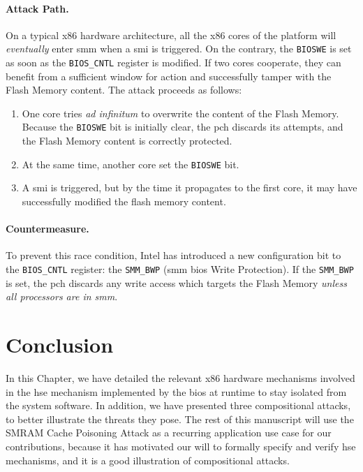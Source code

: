 \paragraph{Attack Path.}
%
On a typical x86 hardware architecture, all the x86 cores of the platform will
\emph{eventually} enter \ac{smm} when a \ac{smi} is triggered.
%
On the contrary, the \texttt{BIOSWE} is set as soon as the \texttt{BIOS\_CNTL}
register is modified.
%
If two cores cooperate, they can benefit from a sufficient window for action and
successfully tamper with the Flash Memory content.
%
The attack proceeds as follows:

\begin{enumerate}
\item One core tries \emph{ad infinitum} to overwrite the content of the Flash
  Memory.
  Because the \texttt{BIOSWE} bit is initially clear, the \ac{pch} discards its
  attempts, and the Flash Memory content is correctly protected.
%
\item At the same time, another core set the \texttt{BIOSWE} bit.
%
\item A \ac{smi} is triggered, but by the time it propagates to the first core,
  it may have successfully modified the flash memory content.
%
\end{enumerate}

\paragraph{Countermeasure.}
%
To prevent this race condition, Intel has introduced a new configuration bit to
the \texttt{BIOS\_CNTL} register: the \texttt{SMM\_BWP} (\ac{smm} \ac{bios}
Write Protection).
%
If the \texttt{SMM\_BWP} is set, the \ac{pch} discards any write access which
targets the Flash Memory \emph{unless all processors are in \ac{smm}}.

\section{Conclusion}
\label{sec:usecase:conclusion}

In this Chapter, we have detailed the relevant x86 hardware mechanisms involved
in the \ac{hse} mechanism implemented by the \ac{bios} at runtime to stay
isolated from the system software.
%
In addition, we have presented three compositional attacks, to better illustrate
the threats they pose.
%
The rest of this manuscript will use the SMRAM Cache Poisoning Attack as a
recurring application use case for our contributions, because it has motivated
our will to formally specify and verify \ac{hse} mechanisms, and it is a good
illustration of compositional attacks.

